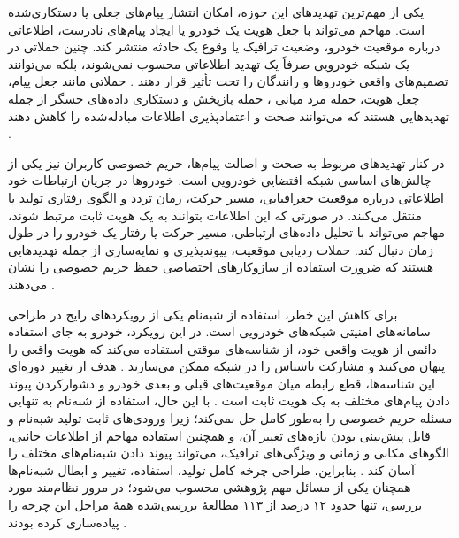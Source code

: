 یکی از مهم‌ترین تهدیدهای این حوزه، امکان انتشار پیام‌های جعلی یا دستکاری‌شده است. مهاجم می‌تواند با جعل هویت یک خودرو یا ایجاد پیام‌های نادرست، اطلاعاتی درباره موقعیت خودرو، وضعیت ترافیک یا وقوع یک حادثه منتشر کند. چنین حملاتی در یک شبکه خودرویی صرفاً یک تهدید اطلاعاتی محسوب نمی‌شوند، بلکه می‌توانند تصمیم‌های واقعی خودروها و رانندگان را تحت تأثیر قرار دهند \cite{farsimadanReviewSecurityChallenges2025}. حملاتی مانند جعل پیام، جعل هویت، حمله مرد میانی ، حمله بازپخش  و دستکاری داده‌های حسگر از جمله تهدیدهایی هستند که می‌توانند صحت و اعتمادپذیری اطلاعات مبادله‌شده را کاهش دهند \cite{farsimadanReviewSecurityChallenges2025,VanetSecurityPrivacy}.

در کنار تهدیدهای مربوط به صحت و اصالت پیام‌ها، حریم خصوصی کاربران نیز یکی از چالش‌های اساسی شبکه اقتضایی خودرویی است. خودروها در جریان ارتباطات خود اطلاعاتی درباره موقعیت جغرافیایی، مسیر حرکت، زمان تردد و الگوی رفتاری تولید یا منتقل می‌کنند. در صورتی که این اطلاعات بتوانند به یک هویت ثابت مرتبط شوند، مهاجم می‌تواند با تحلیل داده‌های ارتباطی، مسیر حرکت یا رفتار یک خودرو را در طول زمان دنبال کند. حملات ردیابی موقعیت، پیوندپذیری  و نمایه‌سازی  از جمله تهدیدهایی هستند که ضرورت استفاده از سازوکارهای اختصاصی حفظ حریم خصوصی را نشان می‌دهند \cite{farsimadanReviewSecurityChallenges2025,rahmawatiagustinaSystematicLiteratureReview2025}.

برای کاهش این خطر، استفاده از شبه‌نام  یکی از رویکردهای رایج در طراحی سامانه‌های امنیتی شبکه‌های خودرویی است. در این رویکرد، خودرو به جای استفاده دائمی از هویت واقعی خود، از شناسه‌های موقتی استفاده می‌کند که هویت واقعی را پنهان می‌کنند و مشارکت ناشناس را در شبکه ممکن می‌سازند \cite{rahmawatiagustinaSystematicLiteratureReview2025}. هدف از تغییر دوره‌ای این شناسه‌ها، قطع رابطه میان موقعیت‌های قبلی و بعدی خودرو و دشوار‌کردن پیوند دادن پیام‌های مختلف به یک هویت ثابت است \cite{luPseudonymChangingSocial2012}. با این حال، استفاده از شبه‌نام به تنهایی مسئله حریم خصوصی را به‌طور کامل حل نمی‌کند؛ زیرا ورودی‌های ثابت تولید شبه‌نام و قابل پیش‌بینی بودن بازه‌های تغییر آن، و همچنین استفاده مهاجم از اطلاعات جانبی، الگوهای مکانی و زمانی و ویژگی‌های ترافیک، می‌تواند پیوند دادن شبه‌نام‌های مختلف را آسان کند \cite{rahmawatiagustinaSystematicLiteratureReview2025,luPseudonymChangingSocial2012}. بنابراین، طراحی چرخه کامل تولید، استفاده، تغییر و ابطال شبه‌نام‌ها همچنان یکی از مسائل مهم پژوهشی محسوب می‌شود؛ در مرور نظام‌مند مورد بررسی، تنها حدود ۱۲ درصد از ۱۱۳ مطالعهٔ بررسی‌شده همهٔ مراحل این چرخه را پیاده‌سازی کرده بودند \cite{rahmawatiagustinaSystematicLiteratureReview2025}.

